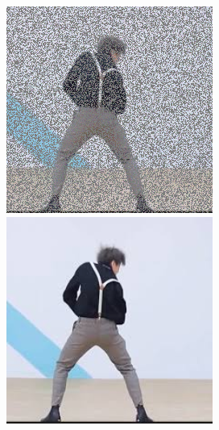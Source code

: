 \begin{figure}[H]
  \centering
  \begin{minipage}[b]{0.3\linewidth}
\includegraphics[width=\linewidth]{Picture/input/kun2_input.png}
  \end{minipage}
  \hspace{0.1cm} %
   \begin{minipage}[b]{0.3\linewidth}
    \includegraphics[width=\linewidth]{Picture/label/kun2_label.png}

\end{minipage}
\end{figure}
